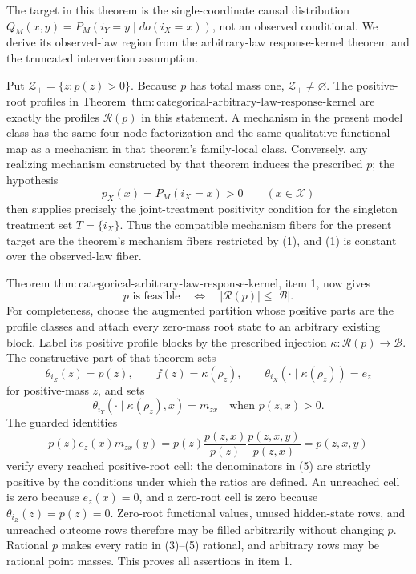 The target in this theorem is the single-coordinate causal distribution
\(Q_M(x,y)=P_M(i_Y=y\mid do(i_X=x))\), not an observed conditional.  We
derive its observed-law region from the arbitrary-law response-kernel
theorem and the truncated intervention assumption.

Put \(\mathcal Z_+=\{z:p(z)>0\}\).  Because \(p\) has total mass one,
\(\mathcal Z_+\ne\varnothing\).  The positive-root profiles in
Theorem~\(\mathrm{thm:categorical\text{-}arbitrary\text{-}law\text{-}response\text{-}kernel}\)
are exactly the profiles \(\mathcal R(p)\) in this statement.  A mechanism
in the present model class has the same four-node factorization and the
same qualitative functional map as a mechanism in that theorem's
family-local class.  Conversely, any realizing mechanism constructed by
that theorem induces the prescribed \(p\); the hypothesis
\[
 p_X(x)=P_M(i_X=x)>0\qquad(x\in\mathcal X)
\tag{1}
\]
then supplies precisely the joint-treatment positivity condition for the
singleton treatment set \(T=\{i_X\}\).  Thus the compatible mechanism
fibers for the present target are the theorem's mechanism fibers restricted
by (1), and (1) is constant over the observed-law fiber.

Theorem
\(\mathrm{thm:categorical\text{-}arbitrary\text{-}law\text{-}response\text{-}kernel}\),
item 1, now gives
\[
 p\text{ is feasible}
 \quad\Longleftrightarrow\quad
 |\mathcal R(p)|\leq|\mathcal B|.
\tag{2}
\]
For completeness, choose the augmented partition whose positive parts are
the profile classes and attach every zero-mass root state to an arbitrary
existing block.  Label its positive profile blocks by the prescribed
injection \(\kappa:\mathcal R(p)\to\mathcal B\).  The constructive part
of that theorem sets
\[
 \theta_{i_Z}(z)=p(z),\qquad
 f(z)=\kappa(\rho_z),\qquad
 \theta_{i_X}(\cdot\mid\kappa(\rho_z))=e_z
\tag{3}
\]
for positive-mass \(z\), and sets
\[
 \theta_{i_Y}(\cdot\mid\kappa(\rho_z),x)=m_{zx}
 \quad\text{when }p(z,x)>0.
\tag{4}
\]
The guarded identities
\[
 p(z)e_z(x)m_{zx}(y)
 =p(z)\frac{p(z,x)}{p(z)}
       \frac{p(z,x,y)}{p(z,x)}
 =p(z,x,y)
\tag{5}
\]
verify every reached positive-root cell; the denominators in (5) are
strictly positive by the conditions under which the ratios are defined.
An unreached cell is zero because \(e_z(x)=0\), and a zero-root cell is
zero because \(\theta_{i_Z}(z)=p(z)=0\).  Zero-root functional values,
unused hidden-state rows, and unreached outcome rows therefore may be
filled arbitrarily without changing \(p\).  Rational \(p\) makes every
ratio in (3)--(5) rational, and arbitrary rows may be rational point
masses.  This proves all assertions in item 1.

